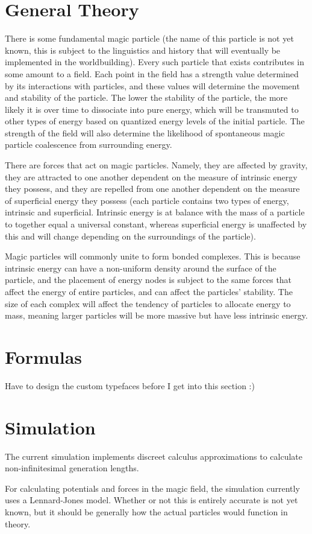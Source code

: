 \documentclass[a4paper]{article}
\begin{document}
\section{General Theory}
There is some fundamental magic particle (the name of this particle is not yet known, this is subject to the linguistics and history that will eventually be implemented in the worldbuilding). Every such particle that exists contributes in some amount to a field. Each point in the field has a strength value determined by its interactions with particles, and these values will determine the movement and stability of the particle. The lower the stability of the particle, the more likely it is over time to dissociate into pure energy, which will be transmuted to other types of energy based on quantized energy levels of the initial particle. The strength of the field will also determine the likelihood of spontaneous magic particle coalescence from surrounding energy.

There are forces that act on magic particles. Namely, they are affected by gravity, they are attracted to one another dependent on the measure of intrinsic energy they possess, and they are repelled from one another dependent on the measure of superficial energy they possess (each particle contains two types of energy, intrinsic and superficial. Intrinsic energy is at balance with the mass of a particle to together equal a universal constant, whereas superficial energy is unaffected by this and will change depending on the surroundings of the particle).

Magic particles will commonly unite to form bonded complexes. This is because intrinsic energy can have a non-uniform density around the surface of the particle, and the placement of energy nodes is subject to the same forces that affect the energy of entire particles, and can affect the particles' stability. The size of each complex will affect the tendency of particles to allocate energy to mass, meaning larger particles will be more massive but have less intrinsic energy.

\section{Formulas}
Have to design the custom typefaces before I get into this section :)

\section{Simulation}
The current simulation implements discreet calculus approximations to calculate non-infinitesimal generation lengths.

For calculating potentials and forces in the magic field, the simulation currently uses a Lennard-Jones model. Whether or not this is entirely accurate is not yet known, but it should be generally how the actual particles would function in theory.
\end{document}
